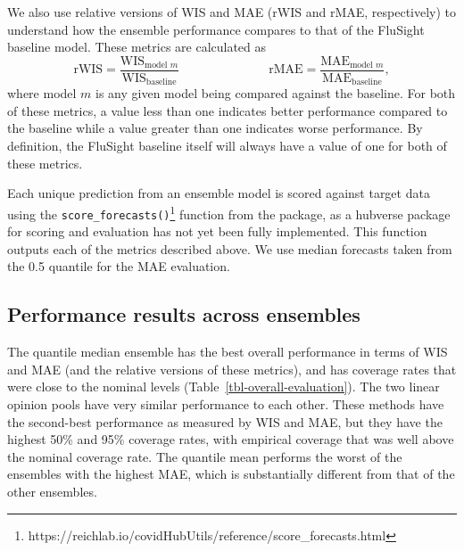 \documentclass[
  article,
  shortnames,
  notitle]{jss}
\begin{document}
We also use relative versions of WIS and MAE (rWIS and rMAE,
respectively) to understand how the ensemble performance compares to
that of the FluSight baseline model. These metrics are calculated as
\[\textrm{rWIS} = \frac{\textrm{WIS}_{\textrm{model }m}}{\textrm{WIS}_{\textrm{baseline}}} \hspace{3cm} \textrm{rMAE} = \frac{\textrm{MAE}_{\textrm{model }m}}{\textrm{MAE}_{\textrm{baseline}}},\]
where model \(m\) is any given model being compared against the
baseline. For both of these metrics, a value less than one indicates
better performance compared to the baseline while a value greater than
one indicates worse performance. By definition, the FluSight baseline
itself will always have a value of one for both of these metrics.

Each unique prediction from an ensemble model is scored against target
data using the \texttt{score\_forecasts()}\footnote{https://reichlab.io/covidHubUtils/reference/score\_forecasts.html}
function from the  package, as a hubverse package for
scoring and evaluation has not yet been fully implemented. This function
outputs each of the metrics described above. We use median forecasts
taken from the 0.5 quantile for the MAE evaluation.

\subsection{Performance results across
ensembles}\label{performance-results-across-ensembles}

The quantile median ensemble has the best overall performance in terms
of WIS and MAE (and the relative versions of these metrics), and has
coverage rates that were close to the nominal levels
(Table~\ref{tbl-overall-evaluation}). The two linear opinion pools have
very similar performance to each other. These methods have the
second-best performance as measured by WIS and MAE, but they have the
highest 50\% and 95\% coverage rates, with empirical coverage that was
well above the nominal coverage rate. The quantile mean performs the
worst of the ensembles with the highest MAE, which is substantially
different from that of the other ensembles.
\end{document}
